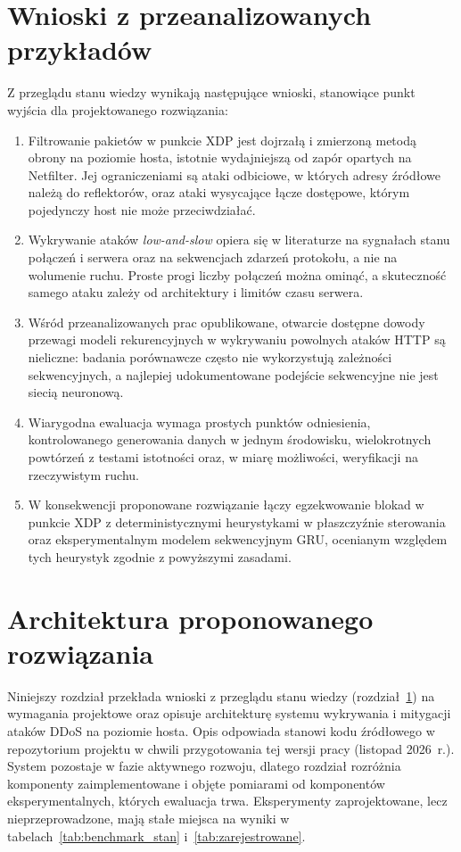 \documentclass[a4paper,12pt]{article}
\begin{document}
\section{Wnioski z przeanalizowanych przykładów}\label{sec:wnioski_przeglad}
Z przeglądu stanu wiedzy wynikają następujące wnioski, stanowiące punkt wyjścia dla projektowanego rozwiązania:
\begin{enumerate}
    \item Filtrowanie pakietów w punkcie XDP jest dojrzałą i zmierzoną metodą obrony na poziomie hosta, istotnie wydajniejszą od zapór opartych na Netfilter. Jej ograniczeniami są ataki odbiciowe, w których adresy źródłowe należą do reflektorów, oraz ataki wysycające łącze dostępowe, którym pojedynczy host nie może przeciwdziałać.
    \item Wykrywanie ataków \textit{low-and-slow} opiera się w literaturze na sygnałach stanu połączeń i serwera oraz na sekwencjach zdarzeń protokołu, a nie na wolumenie ruchu. Proste progi liczby połączeń można ominąć, a skuteczność samego ataku zależy od architektury i limitów czasu serwera.
    \item Wśród przeanalizowanych prac opublikowane, otwarcie dostępne dowody przewagi modeli rekurencyjnych w wykrywaniu powolnych ataków HTTP są nieliczne: badania porównawcze często nie wykorzystują zależności sekwencyjnych, a najlepiej udokumentowane podejście sekwencyjne nie jest siecią neuronową.
    \item Wiarygodna ewaluacja wymaga prostych punktów odniesienia, kontrolowanego generowania danych w jednym środowisku, wielokrotnych powtórzeń z testami istotności oraz, w miarę możliwości, weryfikacji na rzeczywistym ruchu.
    \item W konsekwencji proponowane rozwiązanie łączy egzekwowanie blokad w punkcie XDP z deterministycznymi heurystykami w płaszczyźnie sterowania oraz eksperymentalnym modelem sekwencyjnym GRU, ocenianym względem tych heurystyk zgodnie z powyższymi zasadami.
\end{enumerate}
\section{Architektura proponowanego rozwiązania}\label{sec:architektura}
Niniejszy rozdział przekłada wnioski z przeglądu stanu wiedzy (rozdział~\ref{sec:wnioski_przeglad}) na wymagania projektowe oraz opisuje architekturę systemu wykrywania i mitygacji ataków DDoS na poziomie hosta. Opis odpowiada stanowi kodu źródłowego w repozytorium projektu w chwili przygotowania tej wersji pracy (listopad 2026~r.). System pozostaje w fazie aktywnego rozwoju, dlatego rozdział rozróżnia komponenty zaimplementowane i objęte pomiarami od komponentów eksperymentalnych, których ewaluacja trwa. Eksperymenty zaprojektowane, lecz nieprzeprowadzone, mają stałe miejsca na wyniki w tabelach~\ref{tab:benchmark_stan} i~\ref{tab:zarejestrowane}.
\end{document}
